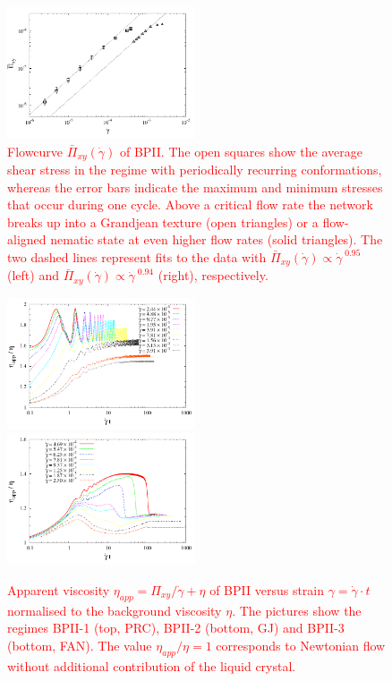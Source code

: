 \documentclass[8.5pt,twoside,twocolumn]{article}
\newcommand{\gd}{\dot{\gamma}}
\newcommand{\rev}[1]{{\textcolor{red}{#1}}}
\begin{document}
\begin{figure}[htpb]
\includegraphics[width=0.495\textwidth]{flowcurve_bp2.pdf}
\caption{
\rev{
Flowcurve $\bar{\Pi}_{xy}(\gd)$ of BPII. The open squares show the average shear stress in the regime with periodically recurring conformations,
whereas the error bars indicate the maximum and minimum stresses that occur during one cycle. Above a critical flow rate the network  
breaks up into a Grandjean texture (open triangles) or a flow-aligned nematic state at even higher flow rates (solid triangles).
The two dashed lines represent fits to the data with $\bar{\Pi}_{xy}(\gd)\propto \gd^{\;0.95}$ (left) and $\bar{\Pi}_{xy}(\gd)\propto \gd^{\;0.94}$ (right), respectively.
}
}
\label{bp2-flowcurve}
\end{figure}

\begin{figure}[htpb]
\includegraphics[width=0.495\textwidth]{app_visc_strain_bp2_a.pdf}\\
\includegraphics[width=0.495\textwidth]{app_visc_strain_bp2_b.pdf}\\
\caption{
\rev{
Apparent viscosity $\eta_{app}=\Pi_{xy}/\gd + \eta$ 
of BPII versus strain $\gamma = \gd\cdot t$  
normalised to the background viscosity $\eta$.
The pictures show the regimes BPII-1 (top, PRC), BPII-2 (bottom, GJ) and BPII-3 (bottom, FAN). 
The value $\eta_{app}/\eta=1$ corresponds to Newtonian flow without additional contribution of the liquid crystal.
}
} 
\label{bp2-appvisc}
\end{figure}
\end{document}
